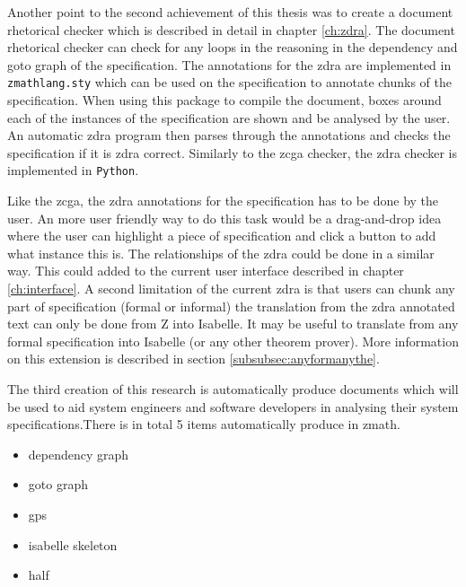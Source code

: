 Another point to the second achievement of this thesis was to create a document rhetorical
checker which is described in detail in chapter \ref{ch:zdra}. The document
rhetorical checker can check for any loops in the reasoning in the dependency
and goto graph of the specification. The annotations for the \gls{zdra} are
implemented in \texttt{zmathlang.sty} which can be used on the specification to
annotate chunks of the specification. When using this package to compile the
document, boxes around each of the instances of the specification are shown and
be analysed by the user. An automatic \gls{zdra} program then parses through the
annotations and checks the specification if it is \gls{zdra} correct. Similarly
to the \gls{zcga} checker, the \gls{zdra} checker is implemented in
\texttt{Python}.

Like the \gls{zcga}, the \gls{zdra} annotations for the specification has to be
done by the user. An more user friendly way to do this task would be a
drag-and-drop idea where the user can highlight a piece of specification and
click a button to add what instance this is. The relationships of the \gls{zdra}
could be done in a similar way. This could added to the current user interface
described in chapter \ref{ch:interface}. A second limitation of the current
\gls{zdra} is that users can chunk any part of specification (formal or
informal) the translation from the \gls{zdra} annotated text can only be done
from Z into Isabelle. It may be useful to translate from any formal
specification into Isabelle (or any other theorem prover). More information on
this extension is described in section \ref{subsubsec:anyformanythe}.

The third creation of this research is automatically produce documents which
will be used to aid system engineers and software developers in analysing their
system specifications.There is in total 5 items automatically produce in
\gls{zmath}.

\begin{itemize}
\item dependency graph

\item goto graph

\item \gls{gps}

\item isabelle skeleton

\item \gls{half}
\end{itemize}

